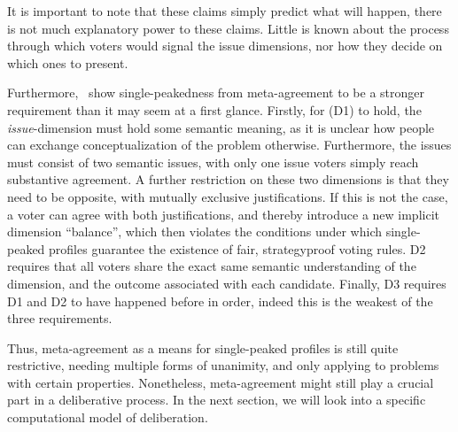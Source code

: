 It is important to note that these claims simply predict what will happen,
there is not much explanatory power to these claims. Little is known about the
process through which voters would signal the issue dimensions, nor how they decide on
which ones to present.

Furthermore,~\citet{ottonelliElusiveNotionMetaagreement2013} show
single-peakedness from meta-agreement to be a stronger requirement than it may
seem at a first glance. Firstly, for (D1) to hold, the \emph{issue}-dimension
must hold some semantic meaning, as it is unclear how people can exchange
conceptualization of the problem otherwise. Furthermore, the issues must
consist of two semantic issues, with only one issue voters simply reach substantive
agreement. A further restriction on these two dimensions is that they need to
be opposite, with mutually exclusive justifications. If this is not the case, a voter can
agree with both justifications, and thereby introduce a new implicit dimension
``balance'', which then violates the conditions under which single-peaked
profiles guarantee the existence of fair, strategyproof voting rules. D2
requires that all voters share the exact same semantic understanding of the
dimension, and the outcome associated with each candidate. Finally, D3 requires
D1 and D2 to have happened before in order, indeed this is the weakest of the
three requirements.

Thus, meta-agreement as a means for single-peaked profiles is still quite
restrictive, needing multiple forms of unanimity, and only applying to problems
with certain properties. Nonetheless,  meta-agreement might still
play a crucial part in a deliberative process. In the next section, we will
look into a specific computational model of deliberation.


